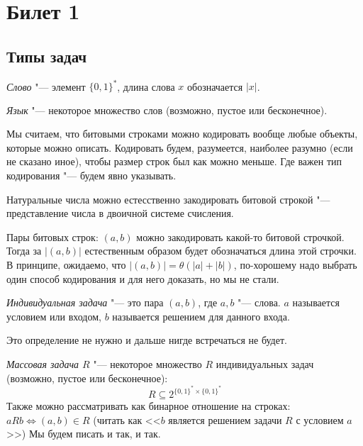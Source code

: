 \setcounter{section}{0}
\section{Билет 1}

\subsection{Типы задач}
	\begin{Def}
		\textit{Слово} "--- элемент $\{0,1\}^*$, длина слова $x$ обозначается $|x|$.
	\end{Def}
	\begin{Def}
		\textit{Язык} "--- некоторое множество слов (возможно, пустое или бесконечное).
	\end{Def}
	\begin{Rem}
		Мы считаем, что битовыми строками можно кодировать вообще любые объекты, которые можно описать.
		Кодировать будем, разумеется, наиболее разумно (если не сказано иное), чтобы размер строк был как можно меньше.
		Где важен тип кодирования "--- будем явно указывать.
	\end{Rem}
	\begin{exmp}
		Натуральные числа можно естесственно закодировать битовой строкой "--- представление числа в двоичной системе счисления.
	\end{exmp}
	\begin{exmp}
		Пары битовых строк: $(a, b)$ можно закодировать какой-то битовой строчкой.
		Тогда за $|(a, b)|$ естественным образом будет обозначаться длина этой строчки.
		В принципе, ожидаемо, что $|(a, b)| = \theta(|a| + |b|)$, по-хорошему надо выбрать один способ кодирования и для него доказать, но мы не стали.
	\end{exmp}

	\begin{Def}
		\textit{Индивидуальная задача} "--- это пара $(a, b)$, где $a, b$ "--- слова.
		$a$ называется условием или входом, $b$ называется решением для данного входа.
	\end{Def}
	\begin{Rem}
		Это определение не нужно и дальше нигде встречаться не будет.
	\end{Rem}

	\begin{Def}
		\textit{Массовая задача $R$} "--- некоторое множество $R$ индивидуальных задач (возможно, пустое или бесконечное):
		\[ R \subseteq 2^{\{0,1\}^*\times\{0,1\}^*}\] 
		Также можно рассматривать как бинарное отношение на строках: $aRb \iff (a, b) \in R$
		(читать как <<$b$ является решением задачи $R$ с условием $a$>>)
		Мы будем писать и так, и так.
	\end{Def}

